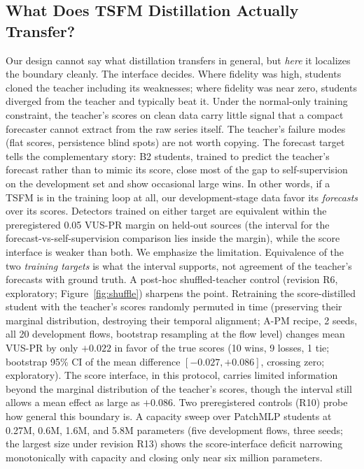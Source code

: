 \documentclass[pdflatex,sn-basic,Numbered]{sn-jnl}
\begin{document}
\subsection{What Does TSFM Distillation Actually Transfer?}
Our design cannot say what distillation transfers in general, but \emph{here}
it localizes the boundary cleanly. The interface decides. Where fidelity was high, students
cloned the teacher including its weaknesses; where fidelity was near
zero, students diverged from the teacher and typically beat it. Under
the normal-only training constraint, the teacher's scores on clean data
carry little signal that a compact forecaster cannot extract from the
raw series itself. The teacher's failure modes (flat scores,
persistence blind spots) are not worth copying. The forecast target
tells the complementary story: B2 students, trained to predict the
teacher's forecast rather than to mimic its score, close most of the gap
to self-supervision on the development set and show occasional large
wins. In other words, if a
TSFM is in the training loop at all, our development-stage data favor
its \emph{forecasts} over its scores. Detectors trained on either
target are equivalent within the preregistered 0.05 VUS-PR margin on
held-out sources (the interval for the forecast-vs-self-supervision
comparison lies inside the margin), while the score interface is weaker
than both. We emphasize the limitation. Equivalence of the two
\emph{training targets} is what the interval supports, not agreement of
the teacher's forecasts with ground truth. A post-hoc shuffled-teacher
control (revision R6, exploratory; Figure~\ref{fig:shuffle}) sharpens the point. Retraining the
score-distilled student with the teacher's scores randomly permuted
in time (preserving their marginal distribution, destroying their
temporal alignment; A-PM recipe, 2 seeds, all 20 development flows,
bootstrap resampling at the flow level) changes mean VUS-PR by only
$+0.022$ in favor of the true scores (10 wins, 9 losses, 1 tie;
bootstrap 95\% CI of the mean difference $[-0.027, +0.086]$, crossing
zero; exploratory).
The score interface, in this protocol, carries limited information
beyond the marginal distribution of the teacher's scores, though the
interval still allows a mean effect as large as $+0.086$.
Two preregistered controls (R10) probe how general this boundary is.
A capacity sweep over PatchMLP students at 0.27M, 0.6M, 1.6M, and 5.8M
parameters (five development flows, three seeds; the largest size under
revision R13) shows the score-interface deficit narrowing monotonically
with capacity and closing only near six million parameters.
\end{document}
